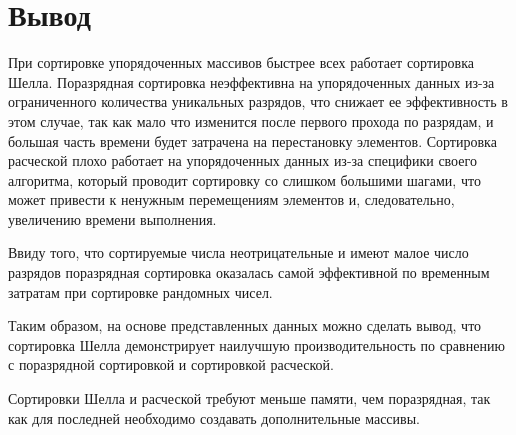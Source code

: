 \section*{Вывод}

При сортировке упорядоченных массивов быстрее всех работает сортировка Шелла.
Поразрядная сортировка неэффективна на упорядоченных данных из-за ограниченного количества уникальных разрядов, что снижает ее эффективность в этом случае, так как мало что изменится после первого прохода по разрядам, и большая часть времени будет затрачена на перестановку элементов.
Сортировка расческой плохо работает на упорядоченных данных из-за специфики своего алгоритма, который проводит сортировку со слишком большими шагами, что может привести к ненужным перемещениям элементов и, следовательно, увеличению времени выполнения.

Ввиду того, что сортируемые числа неотрицательные и имеют малое число разрядов поразрядная сортировка оказалась самой эффективной по временным затратам при сортировке рандомных чисел.

Таким образом, на основе представленных данных можно сделать вывод, что сортировка Шелла демонстрирует наилучшую производительность по сравнению с поразрядной сортировкой и сортировкой расческой.

Сортировки Шелла и расческой требуют меньше памяти, чем поразрядная, так как для последней необходимо создавать дополнительные массивы.